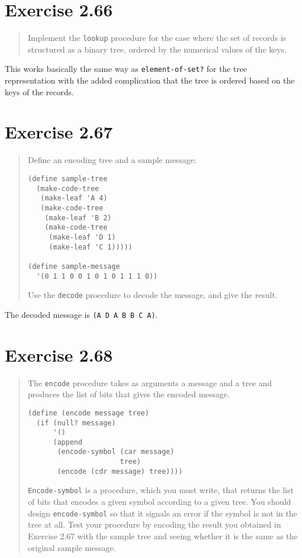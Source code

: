 \documentclass{article}
\begin{document}




\section{Exercise 2.66}
\begin{quote}
    Implement the \texttt{lookup} procedure for the case where the set of
    records is structured as a binary tree, ordered by the numerical values of
    the keys.
\end{quote}

This works basically the same way as \texttt{element-of-set?} for the tree
representation with the added complication that the tree is ordered based on
the keys of the records.



\section{Exercise 2.67}
\begin{quote}
    Define an encoding tree and a sample message:

    \begin{lstlisting}
(define sample-tree
  (make-code-tree
   (make-leaf 'A 4)
   (make-code-tree
    (make-leaf 'B 2)
    (make-code-tree
     (make-leaf 'D 1)
     (make-leaf 'C 1)))))

(define sample-message
  '(0 1 1 0 0 1 0 1 0 1 1 1 0))
    \end{lstlisting}

    Use the \texttt{decode} procedure to decode the message, and give the
    result.
\end{quote}

The decoded message is \texttt{(A D A B B C A)}.

\section{Exercise 2.68}
\begin{quote}
    The \texttt{encode} procedure takes as arguments a message and a tree and
    produces the list of bits that gives the encoded message.

    \begin{lstlisting}
(define (encode message tree)
  (if (null? message)
      '()
      (append
       (encode-symbol (car message)
                      tree)
       (encode (cdr message) tree))))
    \end{lstlisting}

    \texttt{Encode-symbol} is a procedure, which you must write, that returns
    the list of bits that encodes a given symbol according to a given tree. You
    should design \texttt{encode-symbol} so that it signals an error if the
    symbol is not in the tree at all. Test your procedure by encoding the
    result you obtained in Exercise 2.67 with the sample tree and seeing
    whether it is the same as the original sample message.
\end{quote}
\end{document}
